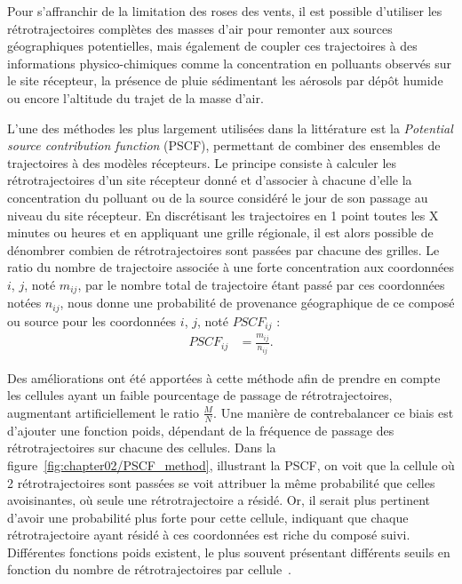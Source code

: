 Pour s'affranchir de la limitation des roses des vents, il est possible d'utiliser les
rétrotrajectoires complètes des masses d'air pour remonter aux sources géographiques
potentielles, mais également de coupler ces trajectoires à des informations
physico-chimiques comme la concentration en polluants observés sur le site récepteur, la
présence de pluie sédimentant les aérosols par dépôt humide ou encore l'altitude du trajet
de la masse d'air.

L'une des méthodes les plus largement utilisées dans la littérature est la \textit{Potential
source contribution function} (PSCF), permettant de combiner des ensembles de trajectoires à
des modèles récepteurs. Le principe consiste à calculer les rétrotrajectoires d'un site
récepteur donné et d'associer à chacune d'elle la concentration du polluant ou de la
source considéré le jour de son passage au niveau du site récepteur. En discrétisant les
trajectoires en 1 point toutes les X minutes ou heures et en appliquant une grille
régionale, il est alors possible de dénombrer combien de rétrotrajectoires sont passées par
chacune des grilles.  Le ratio du nombre de trajectoire associée à une forte concentration
aux coordonnées $i$, $j$, noté $m_{ij}$, par le nombre total de trajectoire étant passé
par ces coordonnées notées $n_{ij}$, nous donne une probabilité de provenance géographique
de ce composé ou source pour les coordonnées $i$, $j$, noté $PSCF_{ij}$ :
\begin{align}
    \label{eq:PSCF}
    PSCF_{ij} &= \frac{m_{ij}}{n_{ij}}.
\end{align}

Des améliorations ont été apportées à cette méthode afin de prendre en compte les cellules
ayant un faible pourcentage de passage de rétrotrajectoires, augmentant artificiellement
le ratio $\frac{M}{N}$. Une manière de contrebalancer ce biais est d'ajouter une fonction
poids, dépendant de la fréquence de passage des rétrotrajectoires sur chacune des
cellules. Dans la figure~\ref{fig:chapter02/PSCF_method}, illustrant la PSCF, on voit que
la cellule où 2 rétrotrajectoires sont passées se voit attribuer la même probabilité que
celles avoisinantes, où seule une rétrotrajectoire a résidé. Or, il serait plus pertinent
d'avoir une probabilité plus forte pour cette cellule, indiquant que chaque
rétrotrajectoire ayant résidé à ces coordonnées est riche du composé suivi.  Différentes
fonctions poids existent, le plus souvent présentant différents seuils en fonction du
nombre de rétrotrajectoires par cellule~\autocite{bressiSources2014,petitSources2019}.

